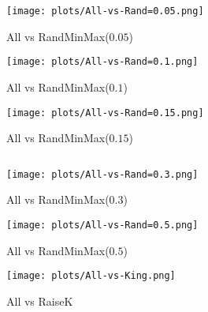 \begin{figure*}[ht]
    \centering

    \begin{minipage}{1.0\textwidth}
    \begin{minipage}{0.05\textwidth}
        
    \end{minipage}
    \begin{minipage}{0.3\textwidth}
        \centering
        \texttt{[image: plots/All-vs-Rand=0.05.png]}
        \caption*{All vs RandMinMax($0.05$)}
    \end{minipage}
    \begin{minipage}{0.3\textwidth}
        \centering
        \texttt{[image: plots/All-vs-Rand=0.1.png]}
        \caption*{All vs RandMinMax($0.1$)}
    \end{minipage}
    \begin{minipage}{0.3\textwidth}
        \centering
        \texttt{[image: plots/All-vs-Rand=0.15.png]}
        \caption*{All vs RandMinMax($0.15$)}
    \end{minipage}
    \begin{minipage}{0.05\textwidth}
        
    \end{minipage}
    \begin{minipage}{1.0\textwidth}
    \centering
    $\;$
    \end{minipage}
    \end{minipage}
    
    \vspace{0.4cm}
    
    \centering
    \begin{minipage}{1.0\textwidth}
    \begin{minipage}{0.05\textwidth}
        
    \end{minipage}
    \begin{minipage}{0.3\textwidth}
        \centering
        \texttt{[image: plots/All-vs-Rand=0.3.png]}
        \caption*{All vs RandMinMax($0.3$)}
    \end{minipage}
    \begin{minipage}{0.3\textwidth}
        \centering
        \texttt{[image: plots/All-vs-Rand=0.5.png]}
        \caption*{All vs RandMinMax($0.5$)}
    \end{minipage}
    \begin{minipage}{0.3\textwidth}
        \centering
        \texttt{[image: plots/All-vs-King.png]}
        \caption*{All vs RaiseK}
    \end{minipage}
    \begin{minipage}{0.05\textwidth}
        

\end{minipage}
\end{minipage}
\end{figure*}
